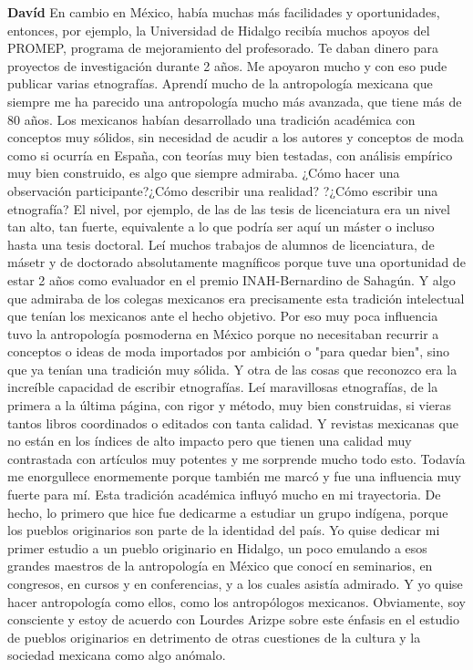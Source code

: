 \documentclass[
  spanish,
  11pt,
  a4paper,
]{scrbook}
\newenvironment{transcripcion}{
    \begin{list}{}{
        \setlength{\leftmargin}{1.5em}  %
        \setlength{\rightmargin}{0em}
        \setlength{\itemsep}{0.2em}     %
        \setlength{\parsep}{0.0em}
        \setlength{\listparindent}{0pt}
    }
}{
    \end{list}
}
\newcommand{\personaje}[1]{\textbf{#1}\quad}
\begin{document}
\begin{transcripcion}
\item \personaje{Davíd} En cambio en México, había muchas más facilidades y oportunidades, entonces, por ejemplo, la Universidad de Hidalgo recibía muchos apoyos del PROMEP, programa de mejoramiento del profesorado. Te daban dinero para proyectos de investigación durante 2 años. Me apoyaron mucho y con eso pude publicar varias etnografías. Aprendí mucho de la antropología mexicana que siempre me ha parecido una antropología mucho más avanzada, que tiene más de 80 años. Los mexicanos habían desarrollado una tradición académica con conceptos muy sólidos, sin necesidad de acudir a los autores y conceptos de moda como si ocurría en España, con teorías muy bien testadas, con análisis empírico muy bien construido, es algo que siempre admiraba. ¿Cómo hacer una observación participante?¿Cómo describir una realidad? ?¿Cómo escribir una etnografía? El nivel, por ejemplo, de las de las tesis de licenciatura era un nivel tan alto, tan fuerte, equivalente a lo que podría ser aquí un máster o incluso hasta una tesis doctoral. Leí muchos trabajos de alumnos de licenciatura, de másetr y de doctorado absolutamente magníficos porque tuve una oportunidad de estar 2 años como evaluador en el premio INAH-Bernardino de Sahagún. Y algo que admiraba de los colegas mexicanos era precisamente esta tradición intelectual que tenían los mexicanos ante el hecho objetivo. Por eso muy poca influencia tuvo la antropología posmoderna en México porque no necesitaban recurrir a conceptos o ideas de moda importados por ambición o "para quedar bien", sino que ya tenían una tradición muy sólida. Y otra de las cosas que reconozco era la increíble capacidad de escribir etnografías. Leí maravillosas etnografías, de la primera a la última página, con rigor y método, muy bien construidas, si vieras tantos libros coordinados o editados con tanta calidad. Y revistas mexicanas que no están en los índices de alto impacto pero que tienen una calidad muy contrastada con artículos muy potentes y me sorprende mucho todo esto. Todavía me enorgullece enormemente porque también me marcó y fue una influencia muy fuerte para mí. Esta tradición académica influyó mucho en mi trayectoria. De hecho, lo primero que hice fue dedicarme a estudiar un grupo indígena, porque los pueblos originarios son parte de la identidad del país. Yo quise dedicar mi primer estudio a un pueblo originario en Hidalgo, un poco emulando a esos grandes maestros de la antropología en México que conocí en seminarios, en congresos, en cursos y en conferencias, y a los cuales asistía admirado. Y yo quise hacer antropología como ellos, como los antropólogos mexicanos. Obviamente, soy consciente y estoy de acuerdo con Lourdes Arizpe sobre este énfasis en el estudio de pueblos originarios en detrimento de otras cuestiones de la cultura y la sociedad mexicana como algo anómalo.


\end{transcripcion}
\end{document}
